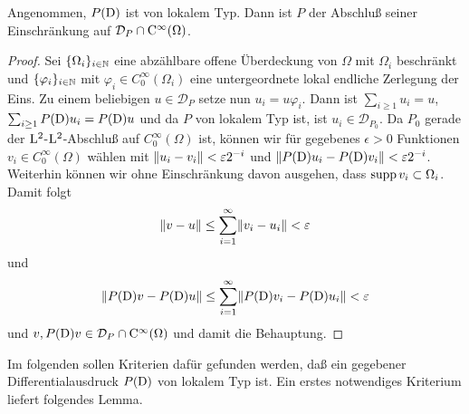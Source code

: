 %
%
%

\begin{thm}
   Angenommen, $P(\mathrm D)$ ist von lokalem Typ. Dann ist $P$ der Abschluß seiner Einschränkung auf $\mathcal D_P\cap \mathrm C^\infty(\Omega)$.
\end{thm}
\begin{proof}
Sei $\{\Omega_i\}_{i\in \mathbb N}$ eine abzählbare offene Überdeckung von $\Omega$ mit $\Omega_i$ beschränkt  und $\{\varphi_i\}_{i\in \mathbb N}$ mit $\varphi_i\in C_0^\infty (\Omega_i)$ eine untergeordnete lokal endliche Zerlegung der Eins. Zu einem beliebigen $u\in\mathcal{D}_P$ setze nun $u_i=u\varphi_i$. Dann ist $\sum_{i\geq 1} u_i=u$, $\sum_{i\geq 1} P(\mathrm D)u_i=P(\mathrm D)u$ und da $P$ von lokalem Typ ist, ist $u_i\in\mathcal{D}_{P_0}$. Da $P_0$ gerade der $\mathrm L^2$-$\mathrm L^2$-Abschluß auf $C_0^\infty(\Omega)$ ist, können wir für gegebenes $\epsilon>0$ Funktionen $v_i\in C_0^\infty(\Omega)$ wählen mit $\lVert u_i-v_i\rVert<\varepsilon 2^{-i}$ und $\lVert P(\mathrm D)u_i-P(\mathrm D)v_i\rVert<\varepsilon 2^{-i}$. Weiterhin können wir ohne Einschränkung davon ausgehen, dass $\operatorname{supp} v_i \subset \Omega_i$. Damit folgt
\begin{equation}
\lVert v-u\rVert\leq \sum_{i=1}^\infty \lVert v_i-u_i\rVert < \varepsilon
\end{equation}
und
\begin{equation}
\lVert P(\mathrm D)v-P(\mathrm D)u\rVert\leq \sum_{i=1}^\infty \lVert P(\mathrm D)v_i-P(\mathrm D)u_i\rVert < \varepsilon
\end{equation}
und $v,P(\mathrm D)v\in \mathcal D_P\cap \mathrm C^\infty(\Omega)$ und damit die Behauptung.
\end{proof}

%
%

Im folgenden sollen Kriterien dafür gefunden werden, daß ein gegebener Differentialausdruck $P(\mathrm D)$ von lokalem Typ ist. Ein erstes notwendiges Kriterium liefert folgendes Lemma.

